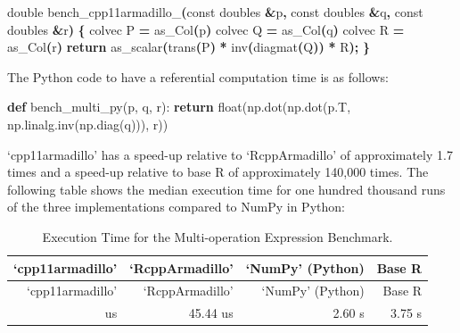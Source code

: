 \documentclass[preprint,12pt, a4paper]{elsarticle}
\newenvironment{Shaded}{\begin{snugshade}}{\end{snugshade}}
\newcommand{\AttributeTok}[1]{\textcolor[rgb]{0.77,0.63,0.00}{#1}}
\newcommand{\BuiltInTok}[1]{#1}
\newcommand{\ControlFlowTok}[1]{\textcolor[rgb]{0.13,0.29,0.53}{\textbf{#1}}}
\newcommand{\DataTypeTok}[1]{\textcolor[rgb]{0.13,0.29,0.53}{#1}}
\newcommand{\KeywordTok}[1]{\textcolor[rgb]{0.13,0.29,0.53}{\textbf{#1}}}
\newcommand{\NormalTok}[1]{#1}
\newcommand{\OperatorTok}[1]{\textcolor[rgb]{0.81,0.36,0.00}{\textbf{#1}}}
\newcommand{\VariableTok}[1]{\textcolor[rgb]{0.00,0.00,0.00}{#1}}
\begin{document}
\begin{Shaded}
\begin{Highlighting}[]
\DataTypeTok{double} \VariableTok{bench\_cpp11armadillo\_}\OperatorTok{(}\AttributeTok{const}\NormalTok{ doubles }\OperatorTok{\&}\NormalTok{p}\OperatorTok{,} \AttributeTok{const}\NormalTok{ doubles }\OperatorTok{\&}\NormalTok{q}\OperatorTok{,}
                             \AttributeTok{const}\NormalTok{ doubles }\OperatorTok{\&}\NormalTok{r}\OperatorTok{)} \OperatorTok{\{}
\NormalTok{  colvec P }\OperatorTok{=}\NormalTok{ as\_Col}\OperatorTok{(}\NormalTok{p}\OperatorTok{)}
\NormalTok{  colvec Q }\OperatorTok{=}\NormalTok{ as\_Col}\OperatorTok{(}\NormalTok{q}\OperatorTok{)}
\NormalTok{  colvec R }\OperatorTok{=}\NormalTok{ as\_Col}\OperatorTok{(}\NormalTok{r}\OperatorTok{)}
  \ControlFlowTok{return}\NormalTok{ as\_scalar}\OperatorTok{(}\NormalTok{trans}\OperatorTok{(}\NormalTok{P}\OperatorTok{)} \OperatorTok{*}\NormalTok{ inv}\OperatorTok{(}\NormalTok{diagmat}\OperatorTok{(}\NormalTok{Q}\OperatorTok{))} \OperatorTok{*}\NormalTok{ R}\OperatorTok{);}
\OperatorTok{\}}
\end{Highlighting}
\end{Shaded}

The Python code to have a referential computation time is as follows:

\begin{Shaded}
\begin{Highlighting}[]
\KeywordTok{def}\NormalTok{ bench\_multi\_py(p, q, r):}
    \ControlFlowTok{return} \BuiltInTok{float}\NormalTok{(np.dot(np.dot(p.T, np.linalg.inv(np.diag(q))), r))}
\end{Highlighting}
\end{Shaded}

`cpp11armadillo' has a speed-up relative to `RcppArmadillo' of
approximately 1.7 times and a speed-up relative to base R of
approximately 140,000 times. The following table shows the median
execution time for one hundred thousand runs of the three
implementations compared to NumPy in Python:

\begin{longtable}[]{@{}rrrr@{}}
\caption{Execution Time for the Multi-operation Expression
Benchmark.}\tabularnewline
\toprule\noalign{}
`cpp11armadillo' & `RcppArmadillo' & `NumPy' (Python) & Base R \\
\midrule\noalign{}
\endfirsthead
\toprule\noalign{}
`cpp11armadillo' & `RcppArmadillo' & `NumPy' (Python) & Base R \\
\midrule\noalign{}
\endhead
\bottomrule\noalign{}
\endlastfoot
26.1 us & 45.44 us & 2.60 s & 3.75 s \\
\end{longtable}
\end{document}
